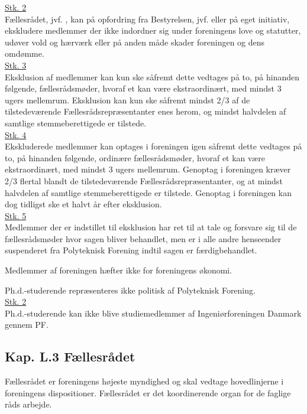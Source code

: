 \begin{list}
\underline{Stk. 2} \\
Fællesrådet, jvf. , kan på opfordring fra Bestyrelsen, jvf.  eller på eget initiativ, ekskludere medlemmer der ikke indordner sig under foreningens love og statutter, udøver vold og hærværk eller på anden måde skader foreningen og dens omdømme.\\

\underline{Stk. 3}\\
Eksklusion af medlemmer kan kun ske såfremt dette vedtages på to, på hinanden følgende, fællesrådsmøder, hvoraf et kan være ekstraordinært, med mindst 3 ugers mellemrum. Eksklusion kan kun ske såfremt mindst 2/3 af de tilstedeværende Fællesrådsrepræsentanter enes herom, og mindst halvdelen af
samtlige stemmeberettigede er tilstede.\\

\underline{Stk. 4}\\
Ekskluderede medlemmer kan optages i foreningen igen såfremt dette vedtages på to, på hinanden følgende, ordinære fællesrådsmøder, hvoraf et kan være ekstraordinært, med mindst 3 ugers mellemrum. Genoptag i foreningen kræver 2/3 flertal blandt de tilstedeværende Fællesrådsrepræsentanter, og at mindst halvdelen af samtlige stemmeberettigede er tilstede. Genoptag i foreningen kan dog tidligst ske et halvt år efter eksklusion.\\

\underline{Stk. 5}\\
Medlemmer der er indstillet til eksklusion har ret til at tale og forsvare sig til de fællesrådsmøder hvor sagen bliver behandlet, men er i alle andre henseender suspenderet fra Polyteknisk Forening indtil sagen er færdigbehandlet.
\item Medlemmer af foreningen hæfter ikke for foreningens økonomi.
\item \label{L:medlem:PHD} Ph.d.-studerende repræsenteres ikke politisk af Polyteknisk Forening.\\

\underline{Stk. 2}\\
Ph.d.-studerende kan ikke blive studiemedlemmer af Ingeniørforeningen Danmark gennem PF.


\subsection*{Kap. L.3 Fællesrådet}
\label{L:kap:faellesraadet}
\item Fællesrådet er foreningens højeste myndighed og skal vedtage hovedlinjerne i foreningens dispositioner. Fællesrådet er det koordinerende organ for de faglige råds arbejde.


\end{list}
